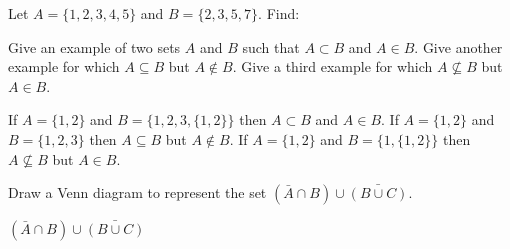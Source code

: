 \begin{questions}


\question Let $A = \{1, 2, 3, 4, 5\}$ and $B = \{2, 3, 5, 7\}$.  Find:

 \begin{answer}
 \end{answer}




\question Give an example of two sets $A$ and $B$ such that $A \subset B$ and $A \in B$.  Give another example for which $A \subseteq B$ but $A \notin B$.  Give a third example for which $A \not\subseteq B$ but $A \in B$.

 \begin{answer}
   If $A = \{1,2\}$ and $B = \{1,2,3,\{1,2\}\}$ then $A \subset B$ and $A \in B$.  If $A = \{1,2\}$ and $B = \{1,2,3\}$ then $A \subseteq B$ but $A \notin B$.  If $A = \{1,2\}$ and $B = \{1, \{1,2\}\}$ then $A \not\subseteq B$ but $A \in B$.
 \end{answer}



\question Draw a Venn diagram to represent the set $(\bar A \cap B) \cup \bar{(B \cup C)}$.

 \begin{answer}
   $(\bar A \cap B) \cup \bar{(B \cup C)}$\\
	\begin{tikzpicture}[fill=gray!50]


\end{tikzpicture}
\end{answer}
\end{questions}
